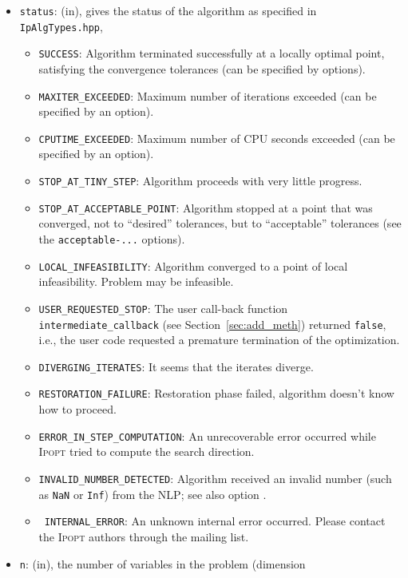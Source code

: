 \documentclass[10pt]{article}
\newcommand{\Ipopt}{\textsc{Ipopt}\xspace}
\begin{document}
\begin{itemize}
\item {\tt status}: (in), gives the status of the algorithm as
  specified in {\tt IpAlgTypes.hpp},
  \begin{itemize}
  \item {\tt SUCCESS}: Algorithm terminated successfully at a locally
    optimal point, satisfying the convergence tolerances (can be
    specified by options).
  \item {\tt MAXITER\_EXCEEDED}: Maximum number of iterations exceeded
    (can be specified by an option).
  \item {\tt CPUTIME\_EXCEEDED}: Maximum number of CPU seconds exceeded
    (can be specified by an option).
  \item {\tt STOP\_AT\_TINY\_STEP}: Algorithm proceeds with very
    little progress.
  \item {\tt STOP\_AT\_ACCEPTABLE\_POINT}: Algorithm stopped at a
    point that was converged, not to ``desired'' tolerances, but to
    ``acceptable'' tolerances (see the {\tt acceptable-...} options).
  \item {\tt LOCAL\_INFEASIBILITY}: Algorithm converged to a point of
    local infeasibility. Problem may be infeasible.
  \item {\tt USER\_REQUESTED\_STOP}: The user call-back function {\tt
      intermediate\_callback} (see Section~\ref{sec:add_meth})
    returned {\tt false}, i.e., the user code requested a premature
    termination of the optimization.
  \item {\tt DIVERGING\_ITERATES}: It seems that the iterates diverge.
  \item {\tt RESTORATION\_FAILURE}: Restoration phase failed,
    algorithm doesn't know how to proceed.
  \item {\tt ERROR\_IN\_STEP\_COMPUTATION}: An unrecoverable error
    occurred while \Ipopt tried to compute the search direction.
  \item {\tt INVALID\_NUMBER\_DETECTED}:  Algorithm received an
    invalid number (such as {\tt NaN} or {\tt Inf}) from the NLP; see
    also option .
  \item {\tt
      INTERNAL\_ERROR}: An unknown internal error occurred.  Please
    contact the \Ipopt authors through the mailing list.
  \end{itemize}
\item {\tt n}: (in), the number of variables in the problem (dimension

\end{itemize}
\end{document}
